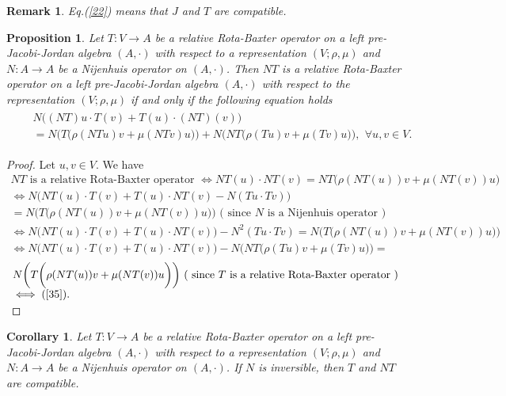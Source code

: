 \documentclass[12pt]{amsart}
\newtheorem{remark}[Theorem]{Remark}
\newtheorem{proposition}[Theorem]{Proposition}
\newtheorem{corollary}[Theorem]{Corollary}
\begin{document}
\begin{remark}
	Eq.(\ref{22}) means that $ J $ and $ T $ are compatible. 
\end{remark}
\begin{proposition}\label{Pro3}
	Let  $ T :V\to A $ be a relative Rota-Baxter operator on a left pre-Jacobi-Jordan algebra $ (A,\cdot) $ with respect to a representation $ (V;\rho,\mu) $ and $ N: A\to A $ be a Nijenhuis operator  on $ (A,\cdot) $. Then $ NT $ is a relative Rota-Baxter operator on a left pre-Jacobi-Jordan algebra $ (A,\cdot) $ with respect to the representation $ (V;\rho,\mu) $ if and only if the following equation holds
	\begin{eqnarray}
		\label{35}
		\begin{array}{lll}
			&&N\bigg((NT)u\cdot T(v)+T(u)\cdot (NT)(v) \bigg)\\
			&&=N\bigg(T\bigg(\rho(NTu)v+\mu(NTv)u\bigg)\bigg)
			+N\bigg(NT\bigg(\rho(Tu)v+\mu(Tv)u\bigg)\bigg),\,\ 
			\forall  u,v\in V.
		\end{array}
	\end{eqnarray}
\end{proposition}
\begin{proof}
	Let $ u,v\in V $. We have\\
	$ \begin{array}{lll}
		\text{$NT$ is  a relative Rota-Baxter operator }\iff NT(u)\cdot NT(v)=NT\bigg(\rho(NT(u))v+\mu(NT(v))u\bigg)\\
		\iff N\bigg(NT(u)\cdot T(v)+T(u)\cdot NT(v)-N(Tu\cdot Tv)\bigg)\\
		=N\bigg(T\bigg(\rho(NT(u))v+\mu(NT(v))u\bigg)\bigg)
		
		\mbox{ ( since $N$ is a Nijenhuis operator )}\\
		\iff N\bigg(NT(u)\cdot T(v)+T(u)\cdot NT(v)\bigg)-N^{2}(Tu\cdot Tv)=N\bigg(T\bigg(\rho(NT(u))v+\mu(NT(v))u\bigg)\bigg)\\
		\iff N\bigg(NT(u)\cdot T(v)+T(u)\cdot NT(v)\bigg)-N\bigg(NT\bigg(\rho(Tu)v+\mu(Tv)u\bigg)\bigg)=\\
			\end{array} $\\
	$ \begin{array}{lll}
		N\bigg(T\bigg(\rho(NT(u))v+\mu(NT(v))u\bigg)\bigg)
		\mbox{  ( since $T$ is a relative Rota-Baxter operator )}
		\\
		\iff(\ref{35}).
	\end{array} $\\
\end{proof}
\begin{corollary}
	Let  $ T :V\to A $ be a relative Rota-Baxter operator on a left pre-Jacobi-Jordan algebra $ (A,\cdot) $ with respect to a representation $ (V;\rho,\mu) $ and $ N: A\to A $ be a Nijenhuis operator  on $ (A,\cdot) $.
	If $ N $ is inversible, then $ T $ and $ NT $ are compatible.
\end{corollary}
\end{document}
